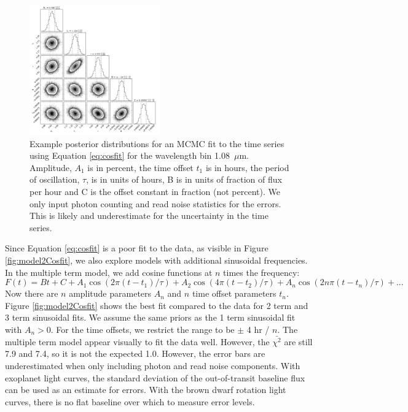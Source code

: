 \documentclass[manuscript]{aastex6}
\begin{document}
\begin{figure}
\begin{centering}
\includegraphics[width=0.5\textwidth]{corner_example.pdf}
\caption{Example posterior distributions for an MCMC fit to the time series using Equation \ref{eq:cosfit} for the wavelength bin 1.08~$\mu$m.
Amplitude, $A_1$ is in percent, the time offset $t_1$ is in hours, the period of oscillation, $\tau$, is in units of hours, B is in units of fraction of flux per hour and C is the offset constant in fraction (not percent).
We only input photon counting and read noise statistics for the errors.
This is likely and underestimate for the uncertainty in the time series.
}\label{fig:postCosfit}
\end{centering}
\end{figure}

Since Equation \ref{eq:cosfit} is a poor fit to the data, as visible in Figure \ref{fig:model2Cosfit}, we also explore models with additional sinusoidal frequencies.
In the multiple term model, we add cosine functions at $n$ times the frequency:
\begin{equation}\label{eq:cosfitMultiTerm}
F(t) = B t + C + A_1 \cos(2 \pi (t - t_1)/\tau) + A_2 \cos(4 \pi (t - t_2)/\tau) + A_n \cos(2 n \pi (t - t_n)/\tau) +  ...
\end{equation}
Now there are $n$ amplitude parameters $A_n$ and $n$ time offset parameters $t_n$.
Figure \ref{fig:model2Cosfit} shows the best fit compared to the data for 2 term and 3 term sinusoidal fits.
We assume the same priors as the 1 term sinusoidal fit with  $A_n > 0$.
For the time offsets, we restrict the range to be $\pm$ 4 hr / $n$.
The multiple term model appear visually to fit the data well.
However, the $\bar{\chi^2}$ are still 7.9 and 7.4, so it is not the expected 1.0.
However, the error bars are underestimated when only including photon and read noise components.
With exoplanet light curves, the standard deviation of the out-of-transit baseline flux can be used as an estimate for errors. With the brown dwarf rotation light curves, there is no flat baseline over which to measure error levels.
\end{document}
